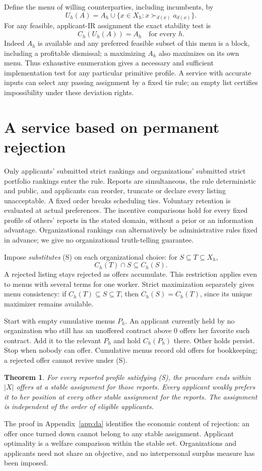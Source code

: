 \documentclass[11pt]{article}
\newtheorem{theorem}{Theorem}
\begin{document}
Define the menu of willing counterparties, including incumbents, by
\[
 U_h(A)= A_h\cup\{x\in X_h:x\succ_{d(x)}a_{d(x)}\}.
\]
For any feasible, applicant-IR assignment the exact stability test is
\begin{equation}
 C_h(U_h(A))=A_h\quad\text{for every }h. \label{eq:test}
\end{equation}
Indeed $A_h$ is available and any preferred feasible subset of this menu is a block, including a profitable dismissal; a maximizing $A_h$ also maximizes on its own menu. Thus exhaustive enumeration gives a necessary and sufficient implementation test for any particular primitive profile. A service with accurate inputs can select any passing assignment by a fixed tie rule; an empty list certifies impossibility under these deviation rights.

\section{A service based on permanent rejection}
Only applicants' submitted strict rankings and organizations' submitted strict portfolio rankings enter the rule. Reports are simultaneous, the rule deterministic and public, and applicants can reorder, truncate or declare every listing unacceptable. A fixed order breaks scheduling ties. Voluntary retention is evaluated at actual preferences. The incentive comparisons hold for every fixed profile of others' reports in the stated domain, without a prior or an information advantage. Organizational rankings can alternatively be administrative rules fixed in advance; we give no organizational truth-telling guarantee.

Impose \emph{substitutes} (S) on each organizational choice: for $S\subseteq T\subseteq X_h$,
\[
 C_h(T)\cap S\subseteq C_h(S).
\]
A rejected listing stays rejected as offers accumulate. This restriction applies even to menus with several terms for one worker. Strict maximization separately gives menu consistency: if $C_h(T)\subseteq S\subseteq T$, then $C_h(S)=C_h(T)$, since its unique maximizer remains available.

Start with empty cumulative menus $P_h$. An applicant currently held by no organization who still has an unoffered contract above $0$ offers her favorite such contract. Add it to the relevant $P_h$ and hold $C_h(P_h)$ there. Other holds persist. Stop when nobody can offer. Cumulative menus record old offers for bookkeeping; a rejected offer cannot revive under (S).

\begin{theorem}\label{th:da}
For every reported profile satisfying (S), the procedure ends within $|X|$ offers at a stable assignment for those reports. Every applicant weakly prefers it to her position at every other stable assignment for the reports. The assignment is independent of the order of eligible applicants.
\end{theorem}
The proof in Appendix~\ref{app:da} identifies the economic content of rejection: an offer once turned down cannot belong to any stable assignment. Applicant optimality is a welfare comparison within the stable set. Organizations and applicants need not share an objective, and no interpersonal surplus measure has been imposed.
\end{document}
